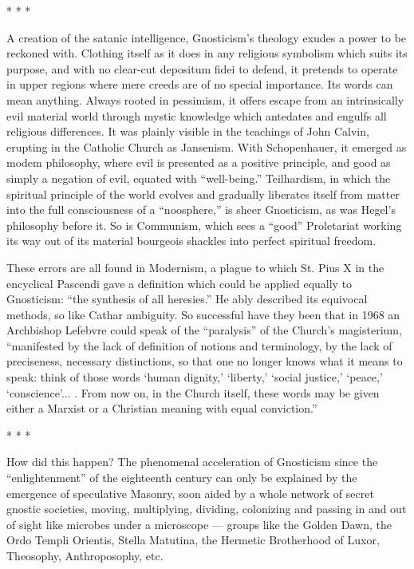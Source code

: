 \begin{center}* * *\end{center}

A creation of the satanic intelligence, Gnosticism's theology exudes a power to be reckoned with. Clothing itself as it does in any religious symbolism which suits its purpose, and with no clear-cut depositum fidei to defend, it pretends to operate in upper regions where mere creeds are of no special importance. Its words can mean anything. Always rooted in pessimism, it offers escape from an intrinsically evil material world through mystic knowledge which antedates and engulfs all religious differences. It was plainly visible in the teachings of John Calvin, erupting in the Catholic Church as Jansenism. With Schopenhauer, it emerged as modem philosophy, where evil is presented as a positive principle, and good as simply a negation of evil, equated with ``well-being.'' Teilhardism, in which the spiritual principle of the world evolves and gradually liberates itself from matter into the full consciousness of a ``noosphere,'' is sheer Gnosticism, as was Hegel's philosophy before it. So is Communism, which sees a ``good'' Proletariat working its way out of its material bourgeois shackles into perfect spiritual freedom.

These errors are all found in Modernism, a plague to which St. Pius X in the encyclical Pascendi gave a definition which could be applied equally to Gnosticism: ``the synthesis of all heresies.'' He ably described its equivocal methods, so like Cathar ambiguity. So successful have they been that in 1968 an Archbishop Lefebvre could speak of the ``paralysis'' of the Church's magisterium, ``manifested by the lack of definition of notions and terminology, by the lack of preciseness, necessary distinctions, so that one no longer knows what it means to speak: think of those words `human dignity,' `liberty,' `social justice,' `peace,' `conscience'... . From now on, in the Church itself, these words may be given either a Marxist or a Christian meaning with equal conviction.''

\begin{center}* * *\end{center}

How did this happen? The phenomenal acceleration of Gnosticism since the ``enlightenment'' of the eighteenth century can only be explained by the emergence of speculative Masonry, soon aided by a whole network of secret gnostic societies, moving, multiplying, dividing, colonizing and passing in and out of sight like microbes under a microscope --- groups like the Golden Dawn, the Ordo Templi Orientis, Stella Matutina, the Hermetic Brotherhood of Luxor, Theosophy, Anthroposophy, etc.

